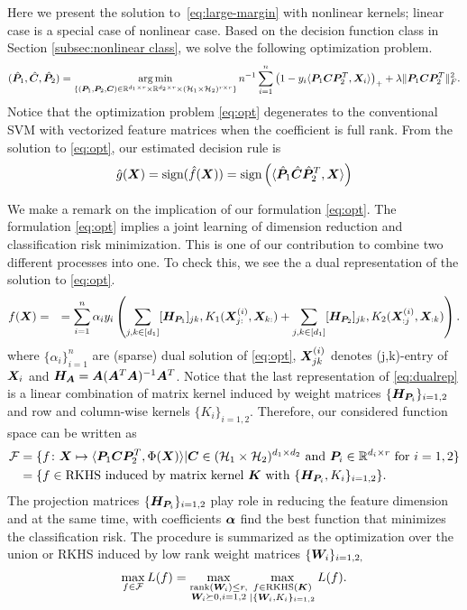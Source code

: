 \documentclass[12pt]{article}
\begin{document}
Here we present the solution to~\eqref{eq:large-margin} with nonlinear kernels; linear case is a special case of nonlinear case. Based on the decision function class in Section \ref{subsec:nonlinear class}, we solve the following optimization problem.
\begin{align}
\label{eq:opt}
(\hat {\bm{P}}_1,\hat{\bm C},\hat{\bm{P}}_2) = \operatorname*{arg\,min}_{\{(\bm{P}_1,\bm{P}_2,\bm C)\in\mathbb{R}^{d_1\times r}\times \mathbb{R}^{d_2\times r}\times (\mathcal{H}_1\times \mathcal{H}_2)^{r\times r}\}}n^{-1}\sum_{i=1}^n \left(1-y_i\langle \bm{P}_1\bm C\bm{P}_2^T,\bm X_i\rangle\right)_++\lambda \lVert\bm{P}_1\bm C\bm{P}_2^T\rVert_F^2.
\end{align}
Notice that the optimization problem \eqref{eq:opt} degenerates to the conventional SVM with vectorized feature matrices when the coefficient is full rank. From the solution to \eqref{eq:opt}, our estimated decision rule is \begin{align}\hat g(\bm X) = \text{sign}(\hat f(\bm X)) =  \text{sign}\left(\langle \hat{\bm{P}}_1\hat{\bm C}\hat{\bm{P}}_2^T,\bm X\rangle\right)\end{align}


We make a remark on the implication of our formulation \eqref{eq:opt}.
The formulation \eqref{eq:opt} implies a joint learning of dimension reduction and classification risk minimization. This is one of our contribution to combine two different processes into one. To check this, we see the a dual representation of the solution to \eqref{eq:opt}.
\begin{align}\label{eq:dualrep}
f(\bm X) &= 
&= \sum_{i=1}^n\alpha_iy_i\left(\sum_{j,k\in[d_1]} [\bm{H}_{\bm{P}_1}]_{jk},K_1(\bm X^{(i)}_{j:},\bm X_{k:})+\sum_{j,k\in[d_1]} [\bm{H}_{\bm{P}_2}]_{jk},K_2(\bm X^{(i)}_{:j},\bm X_{:k})\right).
\end{align}
where $\{\alpha_i\}_{i=1}^n$ are  (sparse) dual solution of \eqref{eq:opt}, $\bm X^{(i)}_{jk}$ denotes (j,k)-entry of $\bm X_i$ and $\bm{H}_{\bm A} = \bm A(\bm A^T\bm A)^{-1}\bm A^T$. Notice that the last representation of \eqref{eq:dualrep} is a linear combination of matrix kernel induced by weight matrices $\{\bm{H}_{\bm{P}_i}\}_{i=1,2}$ and row and column-wise kernels $\{K_i\}_{i=1,2}$. 
Therefore, our considered function space can be written as 
\begin{align}
    \mathcal{F} &= \{f\colon\bm X\mapsto\langle\bm{P}_1\bm C\bm{P}_2^T,\Phi(\bm X)\rangle|\bm C\in(\mathcal{H}_1\times \mathcal{H}_2)^{d_1\times d_2} \text{ and }\bm{P}_i \in\mathbb{R}^{d_i\times r} \text{ for } i=1,2\}\\
    &=\{f\in \text{RKHS induced by matrix kernel } \bm K \text{ with } \{\bm{H}_{\bm{P}_i},K_i\}_{i=1,2}\}.
\end{align}
The projection matrices $\{\bm{H}_{\bm{P}_i}\}_{i=1,2}$ play role in reducing the feature dimension and at the same time, with coefficients $\bm\alpha$ find the best function that minimizes the classification risk. The procedure is summarized as the optimization over the union or RKHS induced by low rank weight matrices $\{\bm{W}_i\}_{i=1,2,}$
\begin{align}
    \max_{f\in\mathcal{F}}L(f)  = \max_{\substack{\text{rank}(\bm{W}_i)\leq r,\\ \bm{W}_i\succeq 0,i = 1,2}}\max_{\substack{f\in\text{RKHS} (\bm K)\\ |\{\bm{W}_i,K_i\}_{i=1,2}}}L(f).
\end{align}
\end{document}
